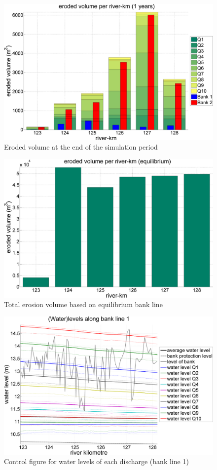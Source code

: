 \begin{figure}
\includegraphics[width=\textwidth]{figures/Fig2-6.png}
\caption{Eroded volume at the end of the simulation period}
\label{Fig2.6}
\end{figure}

\begin{figure}
\includegraphics[width=\textwidth]{figures/Fig2-7.png}
\caption{Total erosion volume based on equilibrium bank line}
\label{Fig2.7}
\end{figure}

\begin{figure}
\includegraphics[width=\textwidth]{figures/Fig2-8.png}
\caption{Control figure for water levels of each discharge (bank line 1)}
\label{Fig2.8}
\end{figure}

